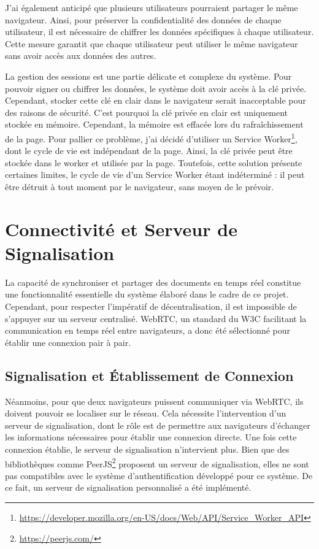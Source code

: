 J'ai également anticipé que plusieurs utilisateurs pourraient partager le même navigateur. Ainsi, pour préserver la confidentialité des données de chaque utilisateur, il est nécessaire de chiffrer les données spécifiques à chaque utilisateur. Cette mesure garantit que chaque utilisateur peut utiliser le même navigateur sans avoir accès aux données des autres.

La gestion des sessions est une partie délicate et complexe du système. Pour pouvoir signer ou chiffrer les données, le système doit avoir accès à la clé privée. Cependant, stocker cette clé en clair dans le navigateur serait inacceptable pour des raisons de sécurité. C'est pourquoi la clé privée en clair est uniquement stockée en mémoire. Cependant, la mémoire est effacée lors du rafraîchissement de la page. Pour pallier ce problème, j'ai décidé d'utiliser un Service Worker\footnote{\url{https://developer.mozilla.org/en-US/docs/Web/API/Service_Worker_API}}, dont le cycle de vie est indépendant de la page. Ainsi, la clé privée peut être stockée dans le worker et utilisée par la page. Toutefois, cette solution présente certaines limites, le cycle de vie d'un Service Worker étant indéterminé : il peut être détruit à tout moment par le navigateur, sans moyen de le prévoir.

\section{Connectivité et Serveur de Signalisation}

La capacité de synchroniser et partager des documents en temps réel constitue une fonctionnalité essentielle du système élaboré dans le cadre de ce projet. Cependant, pour respecter l'impératif de décentralisation, il est impossible de s'appuyer sur un serveur centralisé. \Gls{WebRTC}, un standard du \Gls{W3C} facilitant la communication en temps réel entre navigateurs, a donc été sélectionné pour établir une connexion pair à pair.

\subsection{Signalisation et Établissement de Connexion}

Néanmoins, pour que deux navigateurs puissent communiquer via \Gls{WebRTC}, ils doivent pouvoir se localiser sur le réseau. Cela nécessite l'intervention d'un serveur de signalisation, dont le rôle est de permettre aux navigateurs d'échanger les informations nécessaires pour établir une connexion directe. Une fois cette connexion établie, le serveur de signalisation n'intervient plus. Bien que des bibliothèques comme PeerJS\footnote{\url{https://peerjs.com/}} proposent un serveur de signalisation, elles ne sont pas compatibles avec le système d'authentification développé pour ce système. De ce fait, un serveur de signalisation personnalisé a été implémenté.

